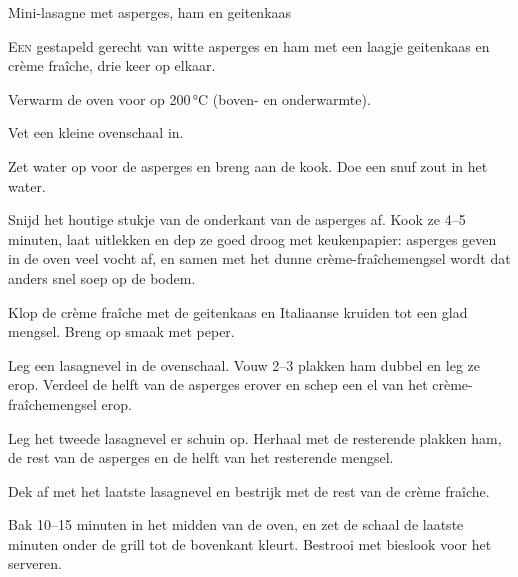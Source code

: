 \begin{recipe}{Mini-lasagne met asperges, ham en geitenkaas}


\lettrine{E}{en} gestapeld gerecht van witte asperges en ham met een laagje geitenkaas
en crème fraîche, drie keer op elkaar. 

\begin{ingredients}
\end{ingredients}

\begin{steps}
  \item Verwarm de oven voor op 200\,°C (boven- en onderwarmte). 
  \item Vet een kleine ovenschaal in.
  \item Zet water op voor de asperges en breng aan de kook. Doe een snuf zout in het water.
  \item Snijd het houtige stukje van de onderkant van de asperges af. Kook ze
        4--5 minuten, laat uitlekken en dep ze goed droog met keukenpapier:
        asperges geven in de oven veel vocht af, en samen met het dunne
        crème-fraîchemengsel wordt dat anders snel soep op de bodem.
  \item Klop de crème fraîche met de geitenkaas en Italiaanse kruiden tot een glad
        mengsel. Breng op smaak met peper.
  \item Leg een lasagnevel in de ovenschaal. Vouw 2--3 plakken ham dubbel en leg
        ze erop. Verdeel de helft van de asperges erover en schep een el van het
        crème-fraîchemengsel erop. 
  \item Leg het tweede lasagnevel er schuin op. Herhaal met de resterende
        plakken ham, de rest van de asperges en de helft van het resterende
        mengsel. 
  \item Dek af met het laatste lasagnevel en bestrijk met de rest van de crème fraîche.
  \item Bak 10--15 minuten in het midden van de oven, en zet de schaal de
        laatste minuten onder de grill tot de bovenkant kleurt. Bestrooi met
        bieslook voor het serveren.
\end{steps}

\end{recipe}
